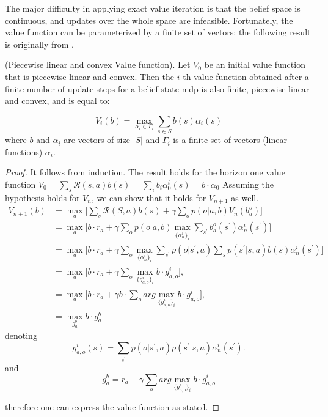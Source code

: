 The major difficulty in applying exact value iteration is that the belief space is continuous, and 
updates over the whole space are infeasible. 
Fortunately, the value function can be parameterized by a finite set of vectors; the following result 
is originally from \cite{1307539f-051d-3d3c-a0d8-111443bed03f}.

\begin{theorem}
    (Piecewise linear and convex Value function). Let \(V_{0}\) be an initial value function
    that is piecewise linear and convex. Then the \(i\)-th value function obtained after a finite
    number of update steps for a belief-state \gls{mdp} is also finite, piecewise linear and convex,
    and is equal to:
   
   \[
   V_{i}(b)=\max _{\alpha_{i} \in \Gamma_{i}} \sum_{s \in S} b(s) \alpha_{i}(s)
   \]
    where \(b\) and \(\alpha_{i}\) are vectors of size \(|S|\) and \(\Gamma_{i}\) is a finite set of vectors (linear functions) \(\alpha_{i}\).
\end{theorem}
\begin{proof}
It follows from induction. The result holds for the horizon one value function
$V_0 = \sum_s \mathcal{R}(s,a)b(s)= \sum_{i}b_i\alpha_{0}^{i}(s)= b \cdot \alpha_0 $
Assuming the hypothesis holds for \(V_n\), we can show that it holds for \(V_{n+1}\) as well.
\begin{align*}
    V_{n+1}(b)&=\displaystyle\max_{a}\Big[\sum_s \mathcal{R}(S,a)b(s)+\gamma\sum_{o}p(o|a,b)V_{n}(b_{a}^{o})\Big] \nonumber\\
    &=\displaystyle\max_{a}\Big[b\cdot r_{a}+\gamma\sum_{o}p(o|a,b)\max_{\{\alpha_{n}^{i}\}_{i}}\sum_{s^{\prime}}b_{a}^{o}(s^{\prime})\alpha_{n}^{i}(s^{\prime})\Big] \nonumber\\
    &=\displaystyle\max_{a}\Big[b\cdot r_{a}+\gamma\sum_{o}\max_{\{\alpha_{n}^{i}\}_{i}}\sum_{s^{\prime}}p(o|s^{\prime},a)\sum_{s}p(s^{\prime}|s,a)b(s)\alpha_{n}^{i}(s^{\prime})\Big] \nonumber\\
    &=\displaystyle\max_{a}\Big[b\cdot r_{a}+\gamma\sum_{o}\max_{\{g_{a,o}^{i}\}_{i}}b\cdot g_{a,o}^{i}\Big], \nonumber\\
    &=\displaystyle\max_{a}\Big[b\cdot r_{a}+\gamma b \cdot \sum_o arg\max_{\{g_{a,o}^{i}\}_{i}}b\cdot g_{a,o}^{i}\Big], \nonumber\\
    &=\displaystyle\max_{g_{a}^b}b \cdot g_a^b \nonumber
\end{align*}
denoting 
\[
\quad g_{a,o}^{i}(s)=\sum_{s^{\prime }}p(o|s^{\prime },a)p(s^{\prime
}|s,a)\alpha _{n}^{i}(s^{\prime }).\quad  
\]
and 
$$g_a^b = r_{a}+\gamma \sum_o arg\max_{\{g_{a,o}^{i}\}_{i}}b\cdot g_{a,o}^{i} $$

therefore one can express the value function as stated.

\end{proof}

